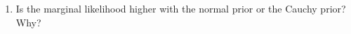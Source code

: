 \documentclass[12pt]{article}
\newcommand{\rar}{{\sffamily\textbf{Rock and roll man! }}}
\begin{document}
\begin{Questions}
\begin{enumerate}
\item [(c)] Is the marginal likelihood higher with the normal
prior or the Cauchy prior? Why?
\end{enumerate}




\end{Questions}
\end{document}
